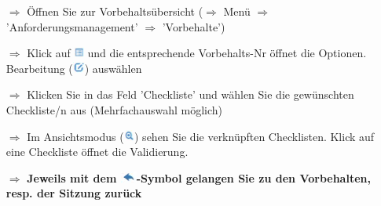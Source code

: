 \documentclass{article}
\begin{document}
\begin{multicols}{2}
\begin{tcolorbox}[colback=blue!5,colframe=blue!40!black,title=Einbindung der Checklisten bei Vorbehalten]
\begin{itemize}
  \item[$\Longrightarrow$] Öffnen Sie zur Vorbehaltsübersicht ($\Rightarrow$ Menü $\Rightarrow$ 'Anforderungsmanagement' $\Rightarrow$ 'Vorbehalte')
  \item[$\Longrightarrow$] Klick auf \includegraphics[height=10pt]{Icons/Listensymbol.jpg} und die entsprechende Vorbehalts-Nr öffnet die Optionen. Bearbeitung (\includegraphics[height=10pt]{Icons/Bearbeiten.jpg}) auswählen
  \item[$\Longrightarrow$] Klicken Sie in das Feld 'Checkliste' und wählen Sie die gewünschten Checkliste/n aus (Mehrfachauswahl möglich)
  \item[$\Longrightarrow$] Im Ansichtsmodus (\includegraphics[height=10pt]{Icons/Lupe.jpg})	sehen Sie die verknüpften Checklisten. Klick auf eine Checkliste öffnet die Validierung.
\vspace{\baselineskip}
  \item[$\Longrightarrow$] \textbf{Jeweils mit dem \includegraphics[height=10pt]{Icons/Pfeil_l.jpg}-Symbol gelangen Sie zu den Vorbehalten, resp. der Sitzung zurück}
\end{itemize}
\end{tcolorbox}


\end{multicols}


\pagebreak
{}

\vspace{\baselineskip}
\end{document}
